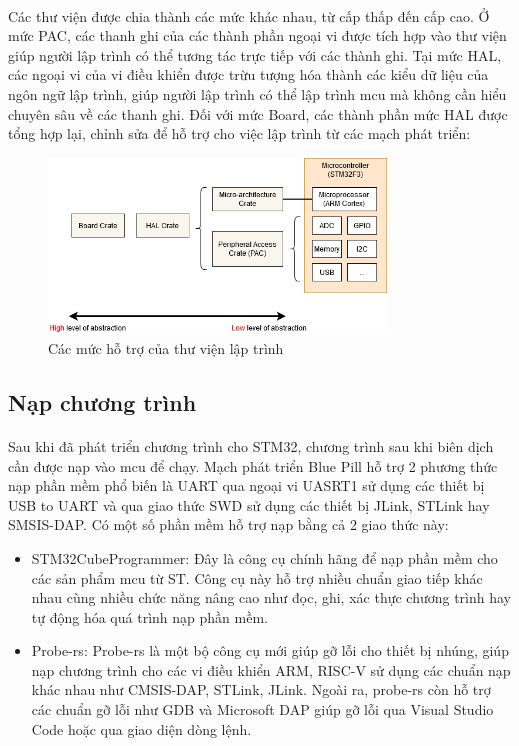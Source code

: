 \paragraph{}
Các thư viện được chia thành các mức khác nhau, từ cấp thấp đến cấp cao. Ở mức PAC, các thanh ghi của các thành phần ngoại vi được tích hợp vào thư viện giúp người lập trình có thể tương tác trực tiếp với các thành ghi. Tại mức HAL, các ngoại vi của vi điều khiển được trừu tượng hóa thành các kiểu dữ liệu của ngôn ngữ lập trình, giúp người lập trình có thể lập trình \acrlong{mcu} mà không cần hiểu chuyên sâu về các thanh ghi. Đối với mức Board, các thành phần mức HAL được tổng hợp lại, chỉnh sửa để hỗ trợ cho việc lập trình từ các mạch phát triển:
\begin{figure}[H]
    \centering
    \includegraphics[width=0.8\textwidth]{images/crates.png}
    \caption{Các mức hỗ trợ của thư viện lập trình}
    \label{fig:enter-label}
\end{figure}
\subsection{Nạp chương trình}
\paragraph{}
Sau khi đã phát triển chương trình cho STM32, chương trình sau khi biên dịch cần được nạp vào \acrshort{mcu} để chạy. Mạch phát triển Blue Pill hỗ trợ 2 phương thức nạp phần mềm phổ biến là UART qua ngoại vi UASRT1 sử dụng các thiết bị USB to UART và qua giao thức SWD sử dụng các thiết bị JLink, STLink hay SMSIS-DAP. Có một số phần mềm hỗ trợ nạp bằng cả 2 giao thức này:
\begin{itemize}
    \item STM32CubeProgrammer: Đây là công cụ chính hãng để nạp phần mềm cho các sản phẩm \acrlong{mcu} từ ST. Công cụ này hỗ trợ nhiều chuẩn giao tiếp khác nhau cùng nhiều chức năng nâng cao như đọc, ghi, xác thực chương trình hay tự động hóa quá trình nạp phần mềm.
    \item Probe-rs: Probe-rs là một bộ công cụ mới giúp gỡ lỗi cho thiết bị nhúng, giúp nạp chương trình cho các vi điều khiển ARM, RISC-V sử dụng các chuẩn nạp khác nhau như CMSIS-DAP, STLink, JLink. Ngoài ra, probe-rs còn hỗ trợ các chuẩn gỡ lỗi như GDB và Microsoft DAP giúp gỡ lỗi qua Visual Studio Code hoặc qua giao diện dòng lệnh.
\end{itemize}
